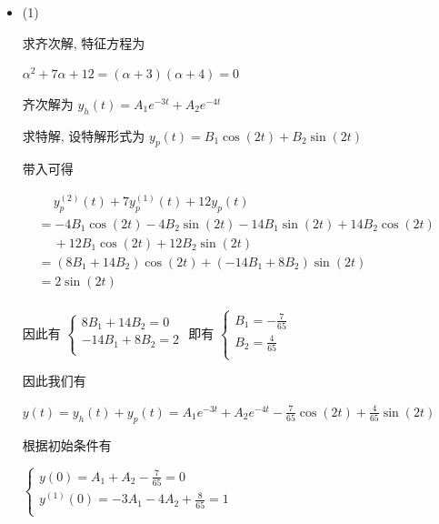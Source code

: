 \documentclass[a4paper,UTF8]{article}
\numberwithin{equation}{section}
\begin{document}
\begin{framed}
\begin{spacing}{1.5}
    \begin{itemize}
      \item (1)

      求齐次解, 特征方程为

      $\alpha^{2}+7\alpha+12 = (\alpha + 3) (\alpha + 4) = 0$
      
      齐次解为 $y_h(t) = A_1 e^{-3t} + A_2 e^{-4t}$
      
      求特解, 设特解形式为 $y_p(t) = B_1 \cos(2t) + B_2 \sin(2t)$
      
      带入可得
      
      $
      \begin{aligned}
      & \quad\ y_p^{(2)}(t) + 7y_p^{(1)}(t) + 12y_p(t)  \\
      & = - 4 B_{1} \cos(2t) - 4 B_{2} \sin(2t) - 14B_1\sin(2t) + 14B_2\cos(2t)  \\
      &\quad\ + 12B_1 \cos(2t) + 12B_2 \sin(2t)  \\
      & = (8 B_{1} + 14 B_{2})\cos(2 t) + (- 14 B_{1} + 8 B_{2}) \sin(2 t)  \\
      & = 2\sin(2 t)  \\
      \end{aligned}
      $
      
      因此有 $\begin{cases}
          8 B_{1} + 14 B_{2} = 0 \\
          - 14 B_{1} + 8 B_{2} = 2 \\
      \end{cases}$ 即有 $\begin{cases}
          B_{1} = - \frac{7}{65} \\
          B_{2} = \frac{4}{65} \\
      \end{cases}$
      
      因此我们有
      
      $\displaystyle y(t) = y_h(t) + y_p(t) = A_1 e^{-3t} + A_2 e^{-4t} - \frac{7}{65}\cos(2t) + \frac{4}{65}\sin(2t)$
      
      根据初始条件有
      
      $
      \begin{cases}
          \displaystyle y(0) = A_{1} + A_{2} - \frac{7}{65} = 0  \\
          \displaystyle y^{(1)}(0) = - 3 A_{1} - 4 A_{2} + \frac{8}{65}= 1  \\
      \end{cases}
      $
      

\end{itemize}
\end{spacing}
\end{framed}
\end{document}
